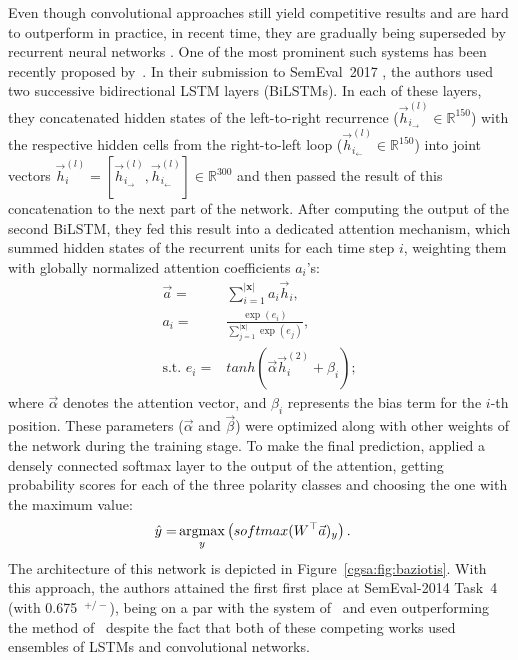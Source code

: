 Even though convolutional approaches still yield competitive results
and are hard to outperform in practice, in recent time, they are
gradually being superseded by recurrent neural networks
\cite{Xu:16,Wang:15}.  One of the most prominent such systems has been
recently proposed by~\citet{Baziotis:17}.  In their submission to
SemEval~2017 \cite{Rosenthal:17}, the authors used two successive
bidirectional LSTM layers (BiLSTMs).  In each of these layers, they
concatenated hidden states of the left-to-right recurrence
($\vec{h}^{(l)}_{i_{\rightarrow}}\in\mathbb{R}^{150}$) with the
respective hidden cells from the right-to-left loop
($\vec{h}^{(l)}_{i_{\leftarrow}}\in\mathbb{R}^{150}$) into joint
vectors $\vec{h}_i^{(l)} = [\vec{h}^{(l)}_{i_{\rightarrow}},
  \vec{h}^{(l)}_{i_{\leftarrow}}]\in\mathbb{R}^{300}$ and then passed
the result of this concatenation to the next part of the network.
After computing the output of the second BiLSTM, they fed this result
into a dedicated attention mechanism, which summed hidden states of
the recurrent units for each time step $i$, weighting them with
globally normalized attention coefficients $a_i$'s:
\begin{align}
  \vec{a} =& \sum_{i=1}^{|\mathbf{x}|}a_i\vec{h}_i,\nonumber\\
  a_i =& \frac{\exp(e_i)}{\sum_{j=1}^{|\mathbf{x}|}\exp(e_j)},\nonumber\\
  \textrm{s.t. }e_i =& tanh\left(\vec{\alpha}\vec{h}^{(2)}_i + \beta_i\right);
\end{align}\label{eq:cgsa:baziotis-attention}
\noindent where $\vec{\alpha}$ denotes the attention vector, and
$\beta_i$ represents the bias term for the $i$-th position.  These
parameters ($\vec{\alpha}$ and $\vec{\beta}$) were optimized along
with other weights of the network during the training stage.  To make
the final prediction, \citeauthor{Baziotis:17} applied a densely
connected softmax layer to the output of the attention, getting
probability scores for each of the three polarity classes and choosing
the one with the maximum value:
\begin{align}
  \hat{y} =& \argmax_y\left(softmax(W^\top\vec{a})_y\right).
\end{align}
\noindent The architecture of this network is depicted in
Figure~\ref{cgsa:fig:baziotis}.  With this approach, the authors
attained the first first place at SemEval-2014 Task~4 (with
0.675~\F{}$^{+/-}$), being on a par with the system
of~\citet{Cliche:17} and even outperforming the method
of~\citet{Rouvier:17} despite the fact that both of these competing
works used ensembles of LSTMs and convolutional networks.

